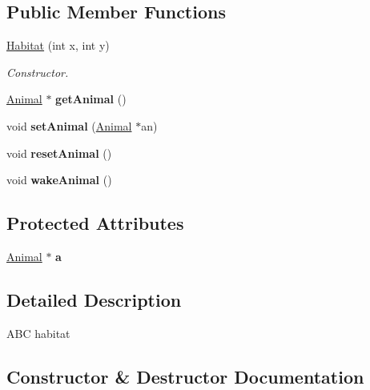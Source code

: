 \subsection*{Public Member Functions}
\begin{DoxyCompactItemize}
\item 
\hyperlink{classHabitat_a7c44b3569efd42413f75b8dbc247f13d}{Habitat} (int x, int y)
\begin{DoxyCompactList}\small\item\em Constructor. \end{DoxyCompactList}\item 
\hyperlink{classAnimal}{Animal} $\ast$ {\bfseries get\+Animal} ()\hypertarget{classHabitat_adde39c6e68550831f7cf69333e6467c3}{}\label{classHabitat_adde39c6e68550831f7cf69333e6467c3}

\item 
void {\bfseries set\+Animal} (\hyperlink{classAnimal}{Animal} $\ast$an)\hypertarget{classHabitat_a1d721052c09f20e00c1719a3de9ce70a}{}\label{classHabitat_a1d721052c09f20e00c1719a3de9ce70a}

\item 
void {\bfseries reset\+Animal} ()\hypertarget{classHabitat_af7c572beb68a0d8b65c73331280fb9aa}{}\label{classHabitat_af7c572beb68a0d8b65c73331280fb9aa}

\item 
void {\bfseries wake\+Animal} ()\hypertarget{classHabitat_aafbf95dbb33f4555a037193b70e5336e}{}\label{classHabitat_aafbf95dbb33f4555a037193b70e5336e}

\end{DoxyCompactItemize}
\subsection*{Protected Attributes}
\begin{DoxyCompactItemize}
\item 
\hyperlink{classAnimal}{Animal} $\ast$ {\bfseries a}\hypertarget{classHabitat_a7ea1dfe236ddcd4121f186d75b33175a}{}\label{classHabitat_a7ea1dfe236ddcd4121f186d75b33175a}

\end{DoxyCompactItemize}


\subsection{Detailed Description}
A\+BC habitat 

\subsection{Constructor \& Destructor Documentation}
